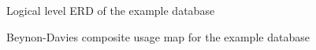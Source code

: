 \documentclass{CRPITStyle}
\begin{document}
\begin{figure}[htbp]
	\caption{Logical level ERD of the example database}
	\label{fig-ERD}
\end{figure}


\begin{figure}[htbp]
	\caption{Beynon-Davies composite usage map for the example database}
	\label{fig-Beynon-Davies}
\end{figure}
\end{document}
